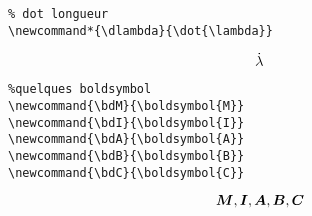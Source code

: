 \documentclass[a4paper,9pt]{article}
\begin{document}
\begin{verbatim}
% dot longueur
\newcommand*{\dlambda}{\dot{\lambda}}
\end{verbatim}
\[
    \dlambda
\]

\begin{verbatim}
%quelques boldsymbol
\newcommand{\bdM}{\boldsymbol{M}}
\newcommand{\bdI}{\boldsymbol{I}}
\newcommand{\bdA}{\boldsymbol{A}}
\newcommand{\bdB}{\boldsymbol{B}}
\newcommand{\bdC}{\boldsymbol{C}}
\end{verbatim}
\[
    \bdM,\bdI,\bdA,\bdB,\bdC
\]
\end{document}
